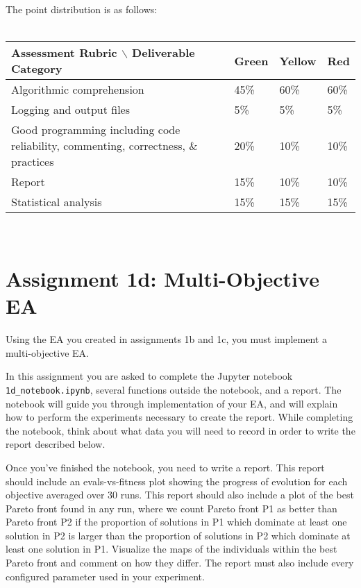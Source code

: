 \documentclass{article}
\begin{document}
The point distribution is as follows:\\
\\
\begin{tabular}{l|l|l|l|}
  Assessment Rubric $\backslash$ Deliverable Category & Green       & Yellow        & Red\\ \hline \hline  
  Algorithmic comprehension                                      & 45\% & 60\% & 60\%\\
  \hline Logging and output files                      & 5\%  & 5\%   & 5\%\\
  \hline Good programming including code reliability, commenting, correctness, \& practices      & 20\%  & 10\% & 10\%\\
  \hline Report    & 15\%  & 10\% & 10\% \\
  \hline Statistical analysis                                          & 15\%   & 15\% &15\%\\
\end{tabular}\\

\newpage

\section*{Assignment 1d: Multi-Objective EA}
Using the EA you created in assignments 1b and 1c, you must implement a multi-objective EA.

In this assignment you are asked to complete the Jupyter notebook \texttt{1d\_notebook.ipynb}, several functions outside the notebook, and a report. The notebook will guide you through implementation of your EA, and will explain how to perform the experiments necessary to create the report. While completing the notebook, think about what data you will need to record in order to write the report described below.

Once you've finished the notebook, you need to write a report. This report should include an evals-vs-fitness plot showing the progress of evolution for each objective averaged over 30 runs. This report should also include a plot of the best Pareto front found in any run, where we count Pareto
front P1 as better than Pareto front P2 if the proportion of solutions in P1 which dominate at least one solution in P2 is larger than the proportion of solutions in P2 which dominate at least one solution in P1. Visualize the maps of the individuals within the best Pareto front and comment on how they differ. The report must also include every configured parameter used in your experiment.
\end{document}
